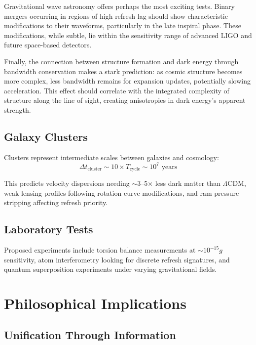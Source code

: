 \documentclass[twocolumn,prd,amsmath,amssymb,aps,superscriptaddress,nofootinbib]{revtex4-2}
\begin{document}
Gravitational wave astronomy offers perhaps the most exciting tests. Binary mergers occurring in regions of high refresh lag should show characteristic modifications to their waveforms, particularly in the late inspiral phase. These modifications, while subtle, lie within the sensitivity range of advanced LIGO and future space-based detectors.

Finally, the connection between structure formation and dark energy through bandwidth conservation makes a stark prediction: as cosmic structure becomes more complex, less bandwidth remains for expansion updates, potentially slowing acceleration. This effect should correlate with the integrated complexity of structure along the line of sight, creating anisotropies in dark energy's apparent strength.

\subsection{Galaxy Clusters}

Clusters represent intermediate scales between galaxies and cosmology:
\begin{equation}
\Delta t_{\text{cluster}} \sim 10 \times T_{\text{cycle}} \sim 10^7 \text{ years}
\end{equation}

This predicts velocity dispersions needing $\sim$3--5× less dark matter than $\Lambda$CDM, weak lensing profiles following rotation curve modifications, and ram pressure stripping affecting refresh priority.

\subsection{Laboratory Tests}

Proposed experiments include torsion balance measurements at $\sim 10^{-15} g$ sensitivity, atom interferometry looking for discrete refresh signatures, and quantum superposition experiments under varying gravitational fields.

\section{Philosophical Implications}
\label{sec:philosophy}

\subsection{Unification Through Information}
\end{document}
